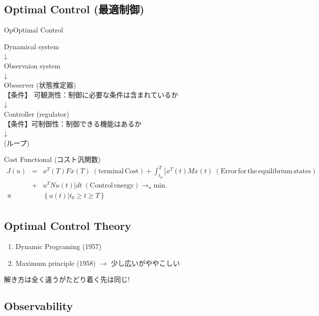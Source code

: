 \documentclass[a4paper]{jsarticle}
\begin{document}
\subsection{Optimal Control (最適制御)}
\begin{itembox}[l]{OpOptimal Control}
    \begin{center}
        Dynamical system\\
        ↓\\
        Observaion system\\
        ↓\\
        Obeserver (状態推定器)\\
        【条件】 可観測性：制御に必要な条件は含まれているか\\
        ↓\\
        Controller (regulator)\\
        【条件】可制御性：制御できる機能はあるか\\
        ↓\\
        (ループ)\\
        \end{center}        
\end{itembox}
\begin{itembox}[l]{Cost Functional (コスト汎関数)}
    \begin{eqnarray*}
        J\left(u\right) &=& x^T\left(T\right) F x \left(T\right) \; \left(\mathrm{terminal\,Cost}\right)+ \int^T_{t_0} [x^T\left(t\right)Mx\left(t\right) \; \left(\mathrm{Error\,for\,the\,equilibrium\,states}\right)\\
        &+& u ^T N u\left(t\right)] dt \; \left(\mathrm{Control\,energy}\right) \rightarrow_u \mathrm{min.}\\
        ※&&\left\{u\left(t\right)|t_0 \geq t \geq T\right\}\\
    \end{eqnarray*}
\end{itembox}

\subsection{Optimal Control Theory}
\begin{enumerate}[(1)]
    \item Dynamic Programing (1957)
    \item Maximum principle (1958) $\rightarrow$ 少し広いがややこしい
\end{enumerate}
解き方は全く違うがたどり着く先は同じ!

\subsection{Observability}
\end{document}
